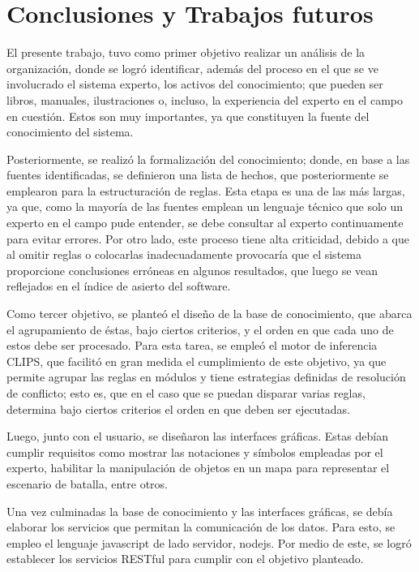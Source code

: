 \chapter{Conclusiones y Trabajos futuros}

El presente trabajo, tuvo como primer objetivo realizar un análisis de la organización, donde se logró identificar, además del proceso en el que se ve involucrado el sistema experto, los activos del conocimiento; que pueden ser libros, manuales, ilustraciones o, incluso, la experiencia del experto en el campo en cuestión. Estos son muy importantes, ya que constituyen la fuente del conocimiento del sistema. 

Posteriormente, se realizó la formalización del conocimiento; donde, en base a las fuentes identificadas, se definieron una lista de hechos, que posteriormente se emplearon para la estructuración de reglas. Esta etapa es una de las más largas, ya que, como la mayoría de las fuentes emplean un lenguaje técnico que solo un experto en el campo pude entender, se debe consultar al experto continuamente para evitar errores. Por otro lado, este proceso tiene alta criticidad, debido a que al omitir reglas o colocarlas inadecuadamente provocaría que el sistema proporcione conclusiones erróneas en algunos resultados, que luego se vean reflejados en el índice de asierto del software.

Como tercer objetivo, se planteó el diseño de la base de conocimiento, que abarca el agrupamiento de éstas, bajo ciertos criterios, y el orden en que cada uno de estos debe ser procesado. Para esta tarea, se empleó el motor de inferencia CLIPS, que facilitó en gran medida el cumplimiento de este objetivo, ya que permite agrupar las reglas en módulos y tiene estrategias definidas de resolución de conflicto; esto es, que en el caso que se puedan disparar varias reglas, determina bajo ciertos criterios el orden en que deben ser ejecutadas.

Luego, junto con el usuario, se diseñaron las interfaces gráficas. Estas debían cumplir requisitos como mostrar las notaciones y símbolos empleadas por el experto, habilitar la manipulación de objetos en un mapa para representar el escenario de batalla, entre otros. 

Una vez culminadas la base de conocimiento y las interfaces gráficas, se debía elaborar los servicios que permitan la comunicación de los datos. Para esto, se empleo el lenguaje javascript de lado servidor, nodejs. Por medio de este, se logró establecer los servicios RESTful para cumplir con el objetivo planteado.

